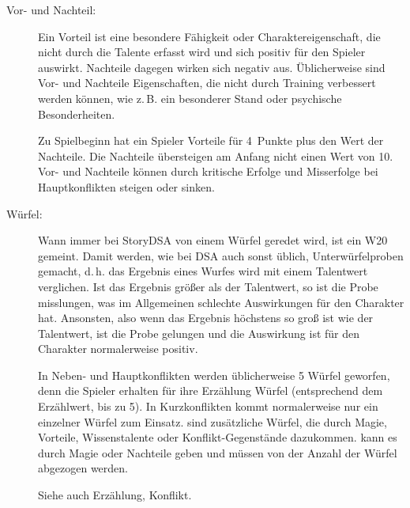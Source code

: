 \begin{description}
\item[Vor- und Nachteil:] Ein Vorteil ist eine besondere Fähigkeit oder Charaktereigenschaft, die nicht durch die Talente erfasst wird und sich positiv für den Spieler auswirkt. Nachteile dagegen wirken sich negativ aus. Üblicherweise sind Vor- und Nachteile Eigenschaften, die nicht durch Training verbessert werden können, wie z.\,B. ein besonderer Stand oder psychische Besonderheiten.

Zu Spielbeginn hat ein Spieler Vorteile für 4~Punkte plus den Wert der Nachteile. Die Nachteile übersteigen am Anfang nicht einen Wert von 10. Vor- und Nachteile können durch kritische Erfolge und Misserfolge bei Hauptkonflikten steigen oder sinken.

\item[Würfel:] Wann immer bei StoryDSA von einem Würfel geredet wird, ist ein W20 gemeint. Damit werden, wie bei DSA auch sonst üblich, Unterwürfelproben gemacht, d.\,h. das Ergebnis eines Wurfes wird mit einem Talentwert verglichen. Ist das Ergebnis größer als der Talentwert, so ist die Probe misslungen, was im Allgemeinen schlechte Auswirkungen für den Charakter hat. Ansonsten, also wenn das Ergebnis höchstens so groß ist wie der Talentwert, ist die Probe gelungen und die Auswirkung ist für den Charakter normalerweise positiv.

In Neben- und Hauptkonflikten werden üblicherweise 5 Würfel geworfen, denn die Spieler erhalten für ihre Erzählung Würfel (entsprechend dem Erzählwert, bis zu 5). In Kurzkonflikten kommt normalerweise nur ein einzelner Würfel zum Einsatz.  sind zusätzliche Würfel, die durch Magie, Vorteile, Wissenstalente oder Konflikt-Gegenstände dazukommen.  kann es durch Magie oder Nachteile geben und müssen von der Anzahl der Würfel abgezogen werden.

Siehe auch Erzählung, Konflikt.

\end{description}





